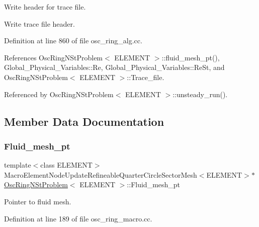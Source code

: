 Write header for trace file. 

Write trace file header. 

Definition at line 860 of file osc\+\_\+ring\+\_\+alg.\+cc.



References Osc\+Ring\+N\+St\+Problem$<$ E\+L\+E\+M\+E\+N\+T $>$\+::fluid\+\_\+mesh\+\_\+pt(), Global\+\_\+\+Physical\+\_\+\+Variables\+::\+Re, Global\+\_\+\+Physical\+\_\+\+Variables\+::\+Re\+St, and Osc\+Ring\+N\+St\+Problem$<$ E\+L\+E\+M\+E\+N\+T $>$\+::\+Trace\+\_\+file.



Referenced by Osc\+Ring\+N\+St\+Problem$<$ E\+L\+E\+M\+E\+N\+T $>$\+::unsteady\+\_\+run().



\subsection{Member Data Documentation}
\mbox{\label{classOscRingNStProblem_a7747a4f4f3bcc507376ca09649fcf6fd}} 
\subsubsection{\texorpdfstring{Fluid\+\_\+mesh\+\_\+pt}{Fluid\_mesh\_pt}\hspace{0.1cm}{\footnotesize\ttfamily [1/2]}}
{\footnotesize\ttfamily template$<$class E\+L\+E\+M\+E\+NT$>$ \\
Macro\+Element\+Node\+Update\+Refineable\+Quarter\+Circle\+Sector\+Mesh$<$E\+L\+E\+M\+E\+NT$>$$\ast$ \hyperlink{classOscRingNStProblem}{Osc\+Ring\+N\+St\+Problem}$<$ E\+L\+E\+M\+E\+NT $>$\+::Fluid\+\_\+mesh\+\_\+pt\hspace{0.3cm}{\ttfamily [private]}}



Pointer to fluid mesh. 



Definition at line 189 of file osc\+\_\+ring\+\_\+macro.\+cc.

\mbox{\label{classOscRingNStProblem_af9ccaa9a5c41ffadda773d704793c76e}} 
